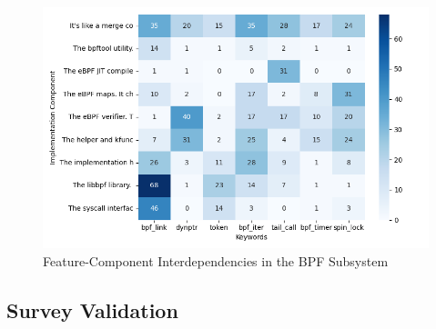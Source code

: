 \begin{figure}[ht]
    \centering
    \includegraphics[width=\linewidth]{feature-analysis/heatmap_bpf_keywords_vs_components.png}
    \caption{Feature-Component Interdependencies in the BPF Subsystem}
    \label{fig:feature_component_heatmap}
\end{figure}


\subsection{Survey Validation}

